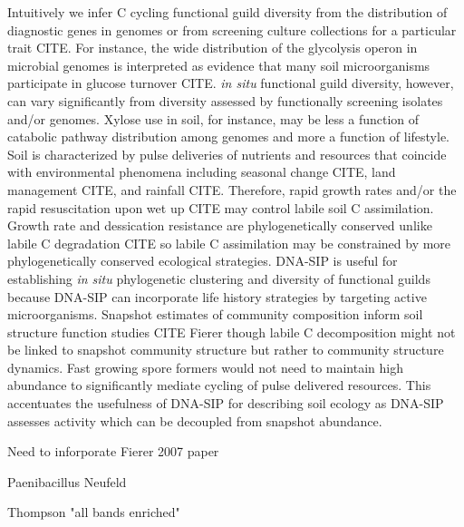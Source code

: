 Intuitively we infer C cycling functional guild diversity from the distribution
of diagnostic genes in genomes or from screening culture collections for
a particular trait CITE. For instance, the wide distribution of the glycolysis
operon in microbial genomes is interpreted as evidence that many soil
microorganisms participate in glucose turnover CITE. \textit{in situ}
functional guild diversity, however, can vary significantly from diversity
assessed by functionally screening isolates and/or genomes. Xylose use in soil,
for instance, may be less a function of catabolic pathway distribution among
genomes and more a function of lifestyle. Soil is characterized by pulse
deliveries of nutrients and resources that coincide with environmental
phenomena including seasonal change CITE, land management CITE, and rainfall
CITE. Therefore, rapid growth rates and/or the rapid resuscitation upon wet up
CITE may control labile soil C assimilation. Growth rate and dessication
resistance are phylogenetically conserved unlike labile C degradation CITE so
labile C assimilation may be constrained by more phylogenetically conserved
ecological strategies. DNA-SIP is useful for establishing \textit{in situ}
phylogenetic clustering and diversity of functional guilds because DNA-SIP can
incorporate life history strategies by targeting active 
microorganisms. Snapshot estimates of community composition inform soil
structure function studies CITE Fierer though labile C decomposition might not
be linked to snapshot community structure but rather to community structure
dynamics. Fast growing spore formers would not need to maintain high abundance
to significantly mediate cycling of pulse delivered resources. This accentuates
the usefulness of DNA-SIP for describing soil ecology as DNA-SIP assesses 
activity which can be decoupled from snapshot abundance. 

Need to inforporate Fierer 2007 paper

Paenibacillus Neufeld

Thompson "all bands enriched"

